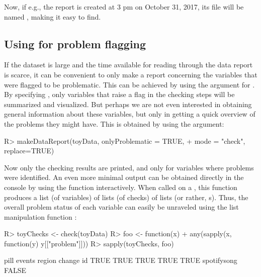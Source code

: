 \documentclass[article,shortnames]{jss}
\begin{document}
Now, if e.g., the report is created at 3 pm on October 31, 2017, its file will be named , making it easy to find. 


\subsection[Using dataMaid for problem flagging]{Using  for problem flagging}
If the dataset is large and the time available for reading through the data report is scarce, it can be convenient to only make a report concerning the variables that were flagged to be problematic. This can be achieved by using the  argument for
. By specifying , only
variables that raise a flag in the checking steps will be summarized
and visualized. But perhaps we are not even interested in obtaining
general information about these variables, but only in getting a quick
overview of the problems they might have. This is obtained by
using the  argument:


\begin{Schunk}
\begin{Sinput}
R> makeDataReport(toyData, onlyProblematic = TRUE, 
+    mode = "check", replace=TRUE)
\end{Sinput}
\end{Schunk}

Now only the checking results are printed, and only for variables
where problems were identified. An even more minimal output  can be obtained directly in the console by using the  function interactively. When called on a , this function produces a list (of
variables) of lists (of checks) of lists (or rather,
s). Thus, the overall problem status of each variable
can easily be unraveled using the list manipulation function
:

\begin{Schunk}
\begin{Sinput}
R> toyChecks <- check(toyData)
R> foo <- function(x) {
+    any(sapply(x, function(y) y[["problem"]])) }
R> sapply(toyChecks, foo)
\end{Sinput}
\begin{Soutput}
       pill      events      region      change          id 
       TRUE        TRUE        TRUE        TRUE        TRUE 
spotifysong 
      FALSE 
\end{Soutput}
\end{Schunk}
\end{document}
